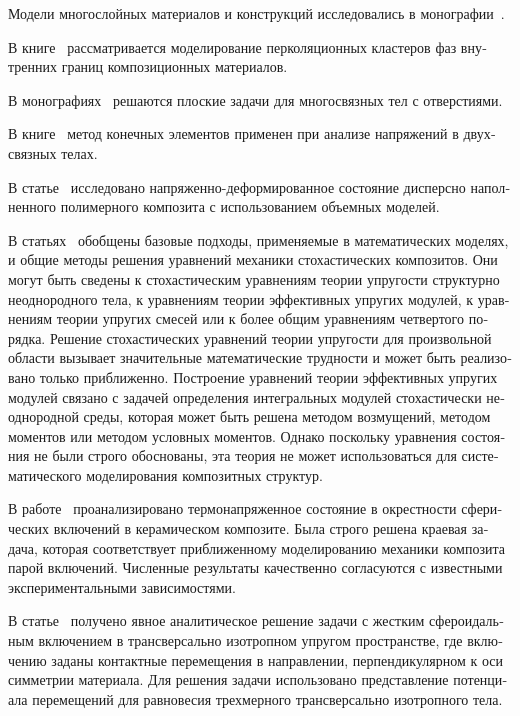 \begin{russian}
Модели многослойных материалов и конструкций исследовались в монографии~\cite{Bolotin}.

В книге~\cite{Gerega} рассматривается моделирование перколяционных кластеров фаз внутренних границ композиционных материалов.

В монографиях~\cite{Grigoliuk, Savin} решаются плоские задачи для многосвязных тел с отверстиями.

В книге~\cite{Erzhanov} метод конечных элементов применен при анализе напряжений в двухсвязных телах.

В статье~\cite{Zharkov} исследовано напряженно-деформированное состояние дисперсно наполненного полимерного композита с использованием объемных моделей.

В статьях~\cite{Khoroshun2000-1, Khoroshun2000-2, Scalon, Trias} обобщены базовые подходы, применяемые в математических моделях, и общие методы решения уравнений механики стохастических композитов. Они могут быть сведены к стохастическим уравнениям теории упругости структурно неоднородного тела, к уравнениям теории эффективных упругих модулей, к уравнениям теории упругих смесей или к более общим уравнениям четвертого порядка. Решение стохастических уравнений теории упругости для произвольной области вызывает значительные математические трудности и может быть реализовано только приближенно. Построение уравнений теории эффективных упругих модулей связано с задачей определения интегральных модулей стохастически неоднородной среды, которая может быть решена методом возмущений, методом моментов или методом условных моментов. Однако поскольку уравнения состояния не были строго обоснованы, эта теория не может использоваться для систематического моделирования композитных структур.

В работе~\cite{Golovchan2000} проанализировано термонапряженное состояние в окрестности сферических включений в   керамическом композите. Была строго решена краевая задача, которая соответствует приближенному моделированию механики композита парой включений. Численные результаты качественно согласуются с известными экспериментальными зависимостями.

В статье~\cite{Zureick1988} получено явное аналитическое решение задачи с жестким сфероидальным включением в трансверсально изотропном упругом пространстве, где включению заданы контактные перемещения в направлении, перпендикулярном к оси симметрии материала. Для решения задачи использовано представление потенциала перемещений для равновесия трехмерного трансверсально изотропного тела.


\end{russian}
